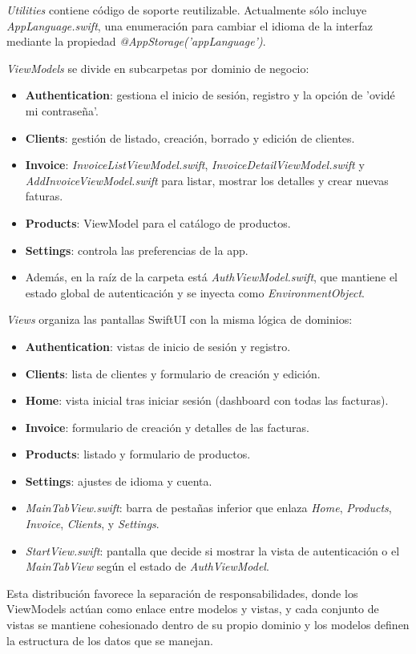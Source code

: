 \begin{large}
\textit{Utilities} contiene código de soporte reutilizable. Actualmente sólo incluye \textit{AppLanguage.swift}, una enumeración para cambiar el idioma de la interfaz mediante la propiedad \textit{@AppStorage('appLanguage')}.

\textit{ViewModels} se divide en subcarpetas por dominio de negocio:
\begin{itemize}
  \item \textbf{Authentication}: gestiona el inicio de sesión, registro y la opción de 'ovidé mi contraseña'.
  \item \textbf{Clients}: gestión de listado, creación, borrado y edición de clientes.
  \item \textbf{Invoice}: \textit{InvoiceListViewModel.swift}, \textit{InvoiceDetailViewModel.swift} y \textit{AddInvoiceViewModel.swift} para listar, mostrar los detalles y crear nuevas faturas.
  \item \textbf{Products}: ViewModel para el catálogo de productos.
  \item \textbf{Settings}: controla las preferencias de la app.
  \item Además, en la raíz de la carpeta está \textit{AuthViewModel.swift}, que mantiene el estado global de autenticación y se inyecta como \textit{EnvironmentObject}.
\end{itemize}

\textit{Views} organiza las pantallas SwiftUI con la misma lógica de dominios:
\begin{itemize}
  \item \textbf{Authentication}: vistas de inicio de sesión y registro.
  \item \textbf{Clients}: lista de clientes y formulario de creación y edición.
  \item \textbf{Home}: vista inicial tras iniciar sesión (dashboard con todas las facturas).
  \item \textbf{Invoice}: formulario de creación y detalles de las facturas.
  \item \textbf{Products}: listado y formulario de productos.
  \item \textbf{Settings}: ajustes de idioma y cuenta.
  \item \textit{MainTabView.swift}: barra de pestañas inferior que enlaza \textit{Home}, \textit{Products}, \textit{Invoice}, \textit{Clients}, y \textit{Settings}.
  \item \textit{StartView.swift}: pantalla que decide si mostrar la vista de autenticación o el \textit{MainTabView} según el estado de \textit{AuthViewModel}.
\end{itemize}

Esta distribución favorece la separación de responsabilidades, donde los 
ViewModels actúan como enlace entre modelos y vistas, y cada conjunto de vistas se mantiene cohesionado dentro de su propio dominio y los modelos definen la estructura de los datos que se manejan.

\end{large}

